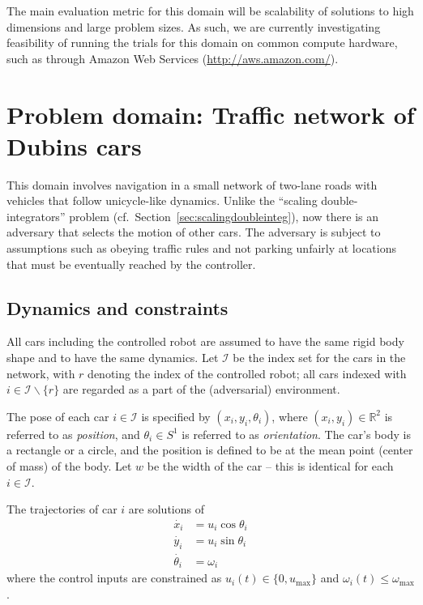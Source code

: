 \documentclass{amsart}
\theoremstyle{definition}
\begin{document}
The main evaluation metric for this domain will be scalability of solutions to
high dimensions and large problem sizes. As such, we are currently investigating
feasibility of running the trials for this domain on common compute hardware,
such as through Amazon Web Services (\url{http://aws.amazon.com/}).


\section{Problem domain: Traffic network of Dubins cars}\label{sec:trafficdubins}

This domain involves navigation in a small network of two-lane roads with
vehicles that follow unicycle-like dynamics. Unlike the ``scaling
double-integrators'' problem (cf.\ Section~\ref{sec:scalingdoubleinteg}), now
there is an adversary that selects the motion of other cars.  The adversary is
subject to assumptions such as obeying traffic rules and not parking unfairly at
locations that must be eventually reached by the controller.

\subsection{Dynamics and constraints}
All cars including the controlled robot are assumed to have the same rigid body
shape and to have the same dynamics. Let $\mathcal I$ be the index set for the
cars in the network, with $r$ denoting the index of the controlled robot; all
cars indexed with $i \in {\mathcal I}\backslash\{r\}$ are regarded as a part of
the (adversarial) environment.

The pose of each car $i \in {\mathcal I}$ is specified by $(x_i,y_i,\theta_i)$,
where $(x_i,y_i)\in \mathbb{R}^2$ is referred to as \textit{position}, and
$\theta_i \in S^1$ is referred to as \textit{orientation}.  The car's body is a
rectangle or a circle, and the position is defined to be at the mean point
(center of mass) of the body.  Let $w$ be the width of the car -- this is
identical for each $i \in {\mathcal I}$.

The trajectories of car $i$ are solutions of
\begin{align}
\dot{x_i} &= u_i \cos \theta_i \\
\dot{y_i} &= u_i \sin \theta_i \\
\dot{\theta_i} &= \omega_i
\end{align}
where the control inputs are constrained as $u_i(t)\in \{0,u_{\mathrm{max}}\}$ and
$\omega_i(t) \leq \omega_{\mathrm{max}}$.
\end{document}
